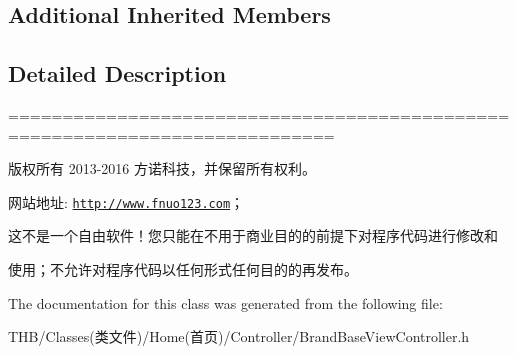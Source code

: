 \subsection*{Additional Inherited Members}


\subsection{Detailed Description}
============================================================================

版权所有 2013-\/2016 方诺科技，并保留所有权利。

网站地址\+: \href{http://www.fnuo123.com}{\tt http\+://www.\+fnuo123.\+com}； 



这不是一个自由软件！您只能在不用于商业目的的前提下对程序代码进行修改和

使用；不允许对程序代码以任何形式任何目的的再发布。 

 

The documentation for this class was generated from the following file\+:\begin{DoxyCompactItemize}
\item 
T\+H\+B/\+Classes(类文件)/\+Home(首页)/\+Controller/Brand\+Base\+View\+Controller.\+h\end{DoxyCompactItemize}
